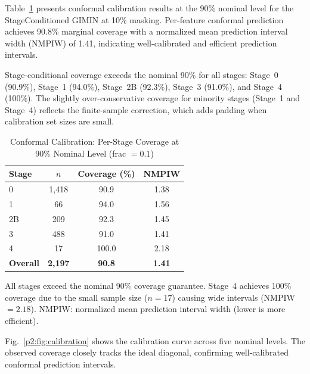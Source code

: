 Table~\ref{p2:tab:conformal} presents conformal calibration results at the 90\% nominal level for the StageConditioned GIMIN at 10\% masking. Per-feature conformal prediction achieves 90.8\% marginal coverage with a normalized mean prediction interval width (NMPIW) of 1.41, indicating well-calibrated and efficient prediction intervals.

Stage-conditional coverage exceeds the nominal 90\% for all stages: Stage~0 (90.9\%), Stage~1 (94.0\%), Stage~2B (92.3\%), Stage~3 (91.0\%), and Stage~4 (100\%). The slightly over-conservative coverage for minority stages (Stage~1 and Stage~4) reflects the finite-sample correction, which adds padding when calibration set sizes are small.

\begin{table}[!t]
\caption{Conformal Calibration: Per-Stage Coverage at 90\% Nominal Level (frac $= 0.1$)}
\label{p2:tab:conformal}
\centering
\footnotesize
\begin{tabular}{@{}lccc@{}}
\toprule
\textbf{Stage} & \textbf{$n$} & \textbf{Coverage (\%)} & \textbf{NMPIW} \\
\midrule
0 & 1,418 & 90.9 & 1.38 \\
1 & 66 & 94.0 & 1.56 \\
2B & 209 & 92.3 & 1.45 \\
3 & 488 & 91.0 & 1.41 \\
4 & 17 & 100.0 & 2.18 \\
\midrule
\textbf{Overall} & \textbf{2,197} & \textbf{90.8} & \textbf{1.41} \\
\bottomrule
\end{tabular}
\vspace{2pt}
\parbox{\columnwidth}{\scriptsize All stages exceed the nominal 90\% coverage guarantee. Stage~4 achieves 100\% coverage due to the small sample size ($n = 17$) causing wide intervals (NMPIW $= 2.18$). NMPIW: normalized mean prediction interval width (lower is more efficient).}
\end{table}

Fig.~\ref{p2:fig:calibration} shows the calibration curve across five nominal levels. The observed coverage closely tracks the ideal diagonal, confirming well-calibrated conformal prediction intervals.

